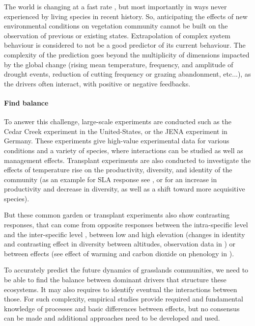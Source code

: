 The world is changing at a fast rate , but most importantly in ways never experienced by living species in recent history\parencite{butchart_global_2010, intergovernmental_panel_on_climate_change_climate_2014}. So, anticipating the effects of new environmental conditions on vegetation community cannot be built on the observation of previous or existing states. Extrapolation of complex system behaviour is considered to not be a good predictor of its current behaviour. The complexity of the prediction goes beyond the multiplicity of dimensions impacted by the global change (rising mean temperature, frequency, and amplitude of drought events, reduction of cutting frequency or grazing abandonment, etc...), as the drivers often interact, with positive or negative feedbacks. 

 \paragraph{Find balance}
 
 
 
 To answer this challenge, large-scale experiments are conducted such as the Cedar Creek experiment in the United-States, or the JENA experiment in Germany. These experiments give high-value experimental data for various conditions and a variety of species, where interactions can be studied as well as management effects. Transplant experiments are also conducted to investigate the effects of temperature rise on the productivity, diversity, and identity of the community (as an example for SLA response see \cite{scheepens_genotypic_2010}, or  \cite{debouk_functional_2015} for an increase in productivity and decrease in diversity, as well as a shift toward more acquisitive species).
 
 But these common garden or transplant experiments also show contrasting responses, that can come from opposite responses between the intra-specific level and the inter-specific level \parencite{jung_intraspecific_2014}, between low and high elevation (changes in identity and contrasting effect in diversity between altitudes, observation data in \cite{rosbakh_elevation_2014}) or between effects (see effect of warming and carbon dioxide on phenology in \cite{reyes-fox_five_2016}).
 
 To accurately predict the future dynamics of grasslands communities, we need to be able to find the balance between dominant drivers that structure these ecosystems. It may also requires to identify eventual the interactions between those. For such complexity, empirical studies provide required and fundamental knowledge of processes and basic differences between effects, but no consensus can be made \parencite{merila_climate_2014} and additional approaches need to be developed and used.
 
